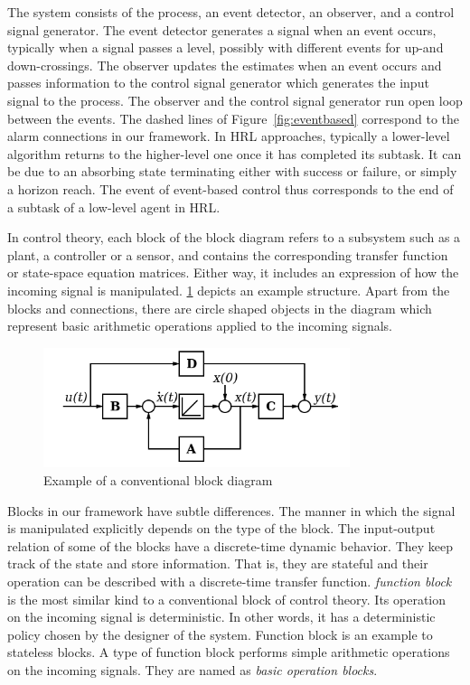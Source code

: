 The system consists of the process, an event detector, an observer, and a control signal generator. The event detector generates a signal when an event occurs, typically when a signal passes a level, possibly with different events for up-and down-crossings. The observer updates the estimates when an event occurs and passes information to the control signal generator which generates the input signal to the process. The observer and the control signal generator run open loop between the events. The dashed lines of Figure~\ref{fig:eventbased} correspond to the alarm connections in our framework. In HRL approaches, typically a lower-level algorithm returns to the higher-level one once it has completed its subtask. It can be due to an absorbing state terminating either with success or failure, or simply a horizon reach. The event of event-based control thus corresponds to the end of a subtask of a low-level agent in HRL. 

In control theory, each block of the block diagram refers to a subsystem such as a plant, a controller or a sensor, and contains the corresponding transfer function or state-space equation matrices. Either way, it includes an expression of how the incoming signal is manipulated. \ref{fig:blockdiagramofcontrolth} depicts an example structure. Apart from the blocks and connections, there are circle shaped objects in the diagram which represent basic arithmetic operations applied to the incoming signals. 

\begin{figure}[t]
      \centering
      \includegraphics[width = 0.8\textwidth]{pictures/blockdiagramofcontrolth.png}
      \caption{Example of a conventional block diagram}
      \label{fig:blockdiagramofcontrolth}
\end{figure}

Blocks in our framework have subtle differences. The manner in which the signal is manipulated explicitly depends on the type of the block. The input-output relation of some of the blocks have a discrete-time dynamic behavior. They keep track of the state and store information. That is, they are stateful and their operation can be described with a discrete-time transfer function. \textit{function block} is the most similar kind to a conventional block of control theory. Its operation on the incoming signal is deterministic. In other words, it has a deterministic policy chosen by the designer of the system. Function block is an example to stateless blocks. A type of function block performs simple arithmetic operations on the incoming signals. They are named as \textit{basic operation blocks}. 

